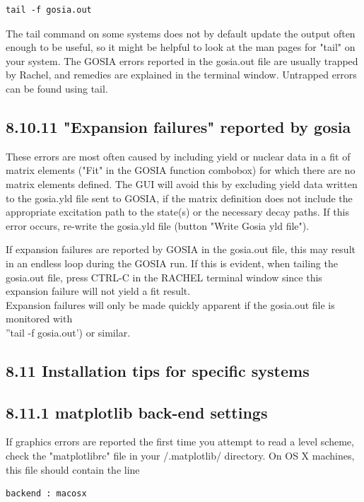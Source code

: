 \documentclass[10pt]{article}
\begin{document}
\begin{verbatim}
tail -f gosia.out
\end{verbatim}

The tail command on some systems does not by default update the output often enough to be useful, so it might be helpful to look at the man pages for "tail" on your system. The GOSIA errors reported in the gosia.out file are usually trapped by Rachel, and remedies are explained in the terminal window. Untrapped errors can be found using tail.

\subsection*{8.10.11 "Expansion failures" reported by gosia}
These errors are most often caused by including yield or nuclear data in a fit of matrix elements ("Fit" in the GOSIA function combobox) for which there are no matrix elements defined. The GUI will avoid this by excluding yield data written to the gosia.yld file sent to GOSIA, if the matrix definition does not include the appropriate excitation path to the state(s) or the necessary decay paths. If this error occurs, re-write the gosia.yld file (button "Write Gosia yld file").

If expansion failures are reported by GOSIA in the gosia.out file, this may result in an endless loop during the GOSIA run. If this is evident, when tailing the gosia.out file, press CTRL-C in the RACHEL terminal window since this expansion failure will not yield a fit result.\\
Expansion failures will only be made quickly apparent if the gosia.out file is monitored with\\
''tail -f gosia.out') or similar.

\subsection*{8.11 Installation tips for specific systems}
\subsection*{8.11.1 matplotlib back-end settings}
If graphics errors are reported the first time you attempt to read a level scheme, check the "matplotlibrc" file in your /.matplotlib/ directory. On OS X machines, this file should contain the line

\begin{verbatim}
backend : macosx
\end{verbatim}
\end{document}
